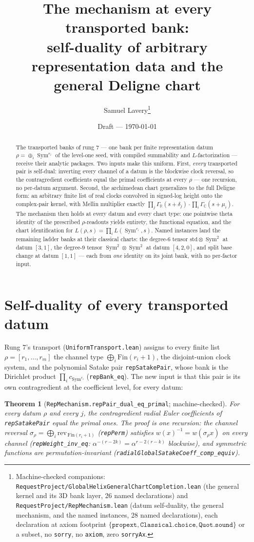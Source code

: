 \documentclass[11pt]{article}
\title{The mechanism at every transported bank:\\
self-duality of arbitrary representation data and the general Deligne chart}
\author{Samuel Lavery\thanks{Machine-checked companions:
\texttt{RequestProject/GlobalHelixGeneralChartCompletion.lean} (the general kernel and
its 3D bank layer, 26 named declarations) and \texttt{RequestProject/RepMechanism.lean}
(datum self-duality, the general mechanism, and the named instances, 28 named
declarations), each declaration at axiom footprint
$\{\texttt{propext},\texttt{Classical.choice},\texttt{Quot.sound}\}$ or a subset,
no \texttt{sorry}, no \texttt{axiom}, zero \texttt{sorryAx}.}}
\date{Draft --- \today}
\newtheorem{theorem}{Theorem}
\newcommand{\Sym}{\operatorname{Sym}}
\newcommand{\Gm}{\Gamma_{\mathbb C}}
\newcommand{\Gr}{\Gamma_{\mathbb R}}
\begin{document}
\maketitle

\begin{abstract}
The transported banks of rung 7 --- one bank per finite representation datum
$\rho=\oplus_i\Sym^{r_i}$ of the level-one seed, with compiled summability and
$L$-factorization --- receive their analytic packages.  Two inputs make this uniform.
First, \emph{every} transported pair is self-dual: inverting every channel of a datum
is the blockwise clock reversal, so the contragredient coefficients equal the primal
coefficients at every $\rho$ --- one recursion, no per-datum argument.  Second, the
archimedean chart generalizes to the full Deligne form: an arbitrary finite list of
real clocks convolved in signed-log height onto the complex-pair kernel, with Mellin
multiplier exactly $\prod_j\Gr(s+\delta_j)\cdot\prod_i\Gm(s+\mu_i)$.  The mechanism
then holds at every datum and every chart type: one pointwise theta identity of the
prescribed $\rho$-readouts yields entirety, the functional equation, and the chart
identification for $L(\rho,s)=\prod_iL(\Sym^{r_i},s)$.  Named instances land the
remaining ladder banks at their classical charts: the degree-6 tensor
$\mathrm{std}\otimes\Sym^2$ at datum $[3,1]$, the degree-9 tensor
$\Sym^2\otimes\Sym^2$ at datum $[4,2,0]$, and split base change at datum $[1,1]$ ---
each from \emph{one} identity on its joint bank, with no per-factor input.
\end{abstract}

\section{Self-duality of every transported datum}

Rung 7's transport (\texttt{UniformTransport.lean}) assigns to every finite list
$\rho=[r_1,\dots,r_m]$ the channel type $\bigoplus_i\mathrm{Fin}(r_i{+}1)$, the
disjoint-union clock system, and the polynomial Satake pair
\texttt{repSatakePair}, whose bank is the Dirichlet product
$\prod_i c_{\Sym^{r_i}}$ (\texttt{repBank\_eq}).  The new input is that this pair is
its own contragredient at the coefficient level, for every datum:

\begin{theorem}[\texttt{RepMechanism.repPair\_dual\_eq\_primal}; machine-checked]
\label{thm:selfdual}
For every datum $\rho$ and every $j$, the contragredient radial Euler coefficients of
\texttt{repSatakePair} equal the primal ones.  The proof is one recursion: the channel
reversal $\sigma_\rho=\bigoplus_i\mathrm{rev}_{\,\mathrm{Fin}(r_i+1)}$
(\texttt{repPerm}) satisfies $w(x)^{-1}=w(\sigma_\rho x)$ on every channel
(\texttt{repWeight\_inv\_eq}: $\alpha^{-(r-2k)}=\alpha^{r-2(r-k)}$ blockwise), and
symmetric functions are permutation-invariant
(\texttt{radialGlobalSatakeCoeff\_comp\_equiv}).
\end{theorem}
\end{document}
